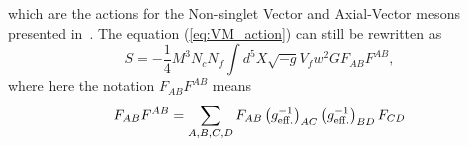 \documentclass[a4paper,12pt]{article}
\begin{document}
which are the actions for the Non-singlet Vector and Axial-Vector mesons presented in~\cite{Arean:2013tja}.
The equation (\ref{eq:VM_action}) can still be rewritten as
\begin{equation}
S = - \frac{1}{4} M^3 N_c N_f \int d^5 X \sqrt{-g} V_f w^2 G F_{AB}F^{AB},
\label{eq:VM_new_action}
\end{equation}
where here the notation $F_{AB}F^{AB}$ means
\begin{equation}
F_{AB}F^{AB} =  \sum_{A,B,C,D}F_{AB} \left(g^{-1}_{\rm{eff.}}\right)_{AC} \left(g^{-1}_{\rm{eff.}}\right)_{BD} F_{CD} %
\end{equation}

\end{document}
